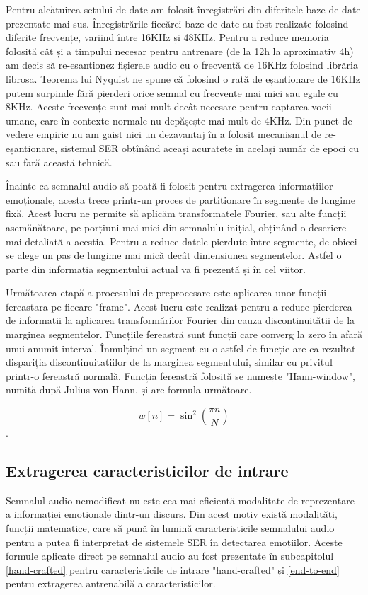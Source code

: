 \documentclass[a4paper,12pt]{book}
\begin{document}
					Pentru alcătuirea setului de date am folosit înregistrări din diferitele baze de date prezentate mai sus. Înregistrările fiecărei baze de date au fost realizate folosind diferite frecvențe, variind între 16KHz și 48KHz. Pentru a reduce memoria folosită cât și a  timpului necesar pentru antrenare (de la 12h la aproximativ 4h) am decis să re-esantionez fișierele audio cu o frecvență de 16KHz folosind librăria librosa. Teorema lui Nyquist ne spune că folosind o rată de eșantionare de 16KHz putem surpinde fără pierderi orice semnal cu frecvente mai mici sau egale cu 8KHz. Aceste frecvențe sunt mai mult decât necesare pentru captarea vocii umane, care în contexte normale nu depășește mai mult de 4KHz. Din punct de vedere empiric nu am gaist nici un dezavantaj în a folosit mecanismul de re-eșantionare, sistemul SER obțînând aceași acuratețe în același număr de epoci cu sau fără această tehnică. \par
					
					Înainte ca semnalul audio să poată fi folosit pentru extragerea informațiilor emoționale, acesta trece printr-un proces de partitionare în segmente de lungime fixă. Acest lucru ne permite să aplicăm transformatele Fourier, sau alte funcții asemănătoare, pe porțiuni mai mici din semnalulu inițial, obținând o descriere mai detaliată a acestia. Pentru a reduce datele pierdute între segmente, de obicei se alege un pas de lungime mai mică decât dimensiunea segmentelor. Astfel o parte din informația segmentului actual va fi prezentă și în cel viitor. \par 
					Următoarea etapă a procesului de preprocesare este aplicarea unor funcții fereastara pe fiecare "frame". Acest lucru este realizat pentru a reduce pierderea de informații la aplicarea transformărilor Fourier din cauza discontinuității de la marginea segmentelor. Funcțiile fereastră sunt funcții care converg la zero în afară unui anumit interval. Înmulțind un segment cu o astfel de funcție are ca rezultat dispariția discontinuitatiilor de la marginea segmentului, similar cu privitul printr-o fereastră normală. Funcția fereastră folosită se numește "Hann-window", numită după Julius von Hann, și are formula următoare. \par
					\begin{equation}
					w[n]=\sin^2(\frac{\pi n}{N})
					\end{equation}.
					
				\subsection{Extragerea caracteristicilor de intrare} \label{fex}
				Semnalul audio nemodificat nu este cea mai eficientă modalitate de reprezentare a informației emoționale dintr-un discurs. Din acest motiv există modalități, funcții matematice, care să pună în lumină caracteristicile semnalului audio pentru a putea fi interpretat de sistemele SER în detectarea emoțiilor. Aceste formule aplicate direct pe semnalul audio au fost prezentate în subcapitolul \ref{hand-crafted} pentru caracteristicile de intrare "hand-crafted" și \ref{end-to-end} pentru extragerea antrenabilă a caracteristicilor. \par
				
\end{document}
